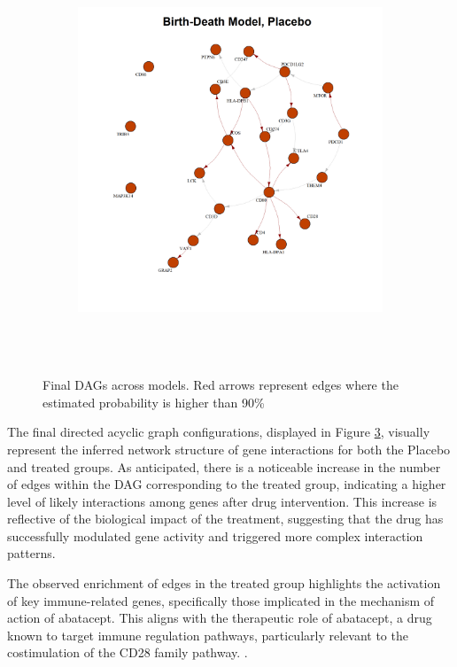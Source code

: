 \documentclass{report}
\begin{document}
\begin{figure}[!ht]
{\begin{minipage}{\textwidth}
\begin{subfigure}[b]{0.45\textwidth}
					\label{fig:net_ad_placebo}
				\end{subfigure}
				\hspace{0.35cm}
				\begin{subfigure}[b]{0.45\textwidth}   
					\centering
					\includegraphics[width=\textwidth, height=12cm]{Figures/Application/analysis/net_BD_placebo.png}
					\label{fig:net_BD_placebo}
				\end{subfigure}
			\end{minipage}
		}
		\caption{Final DAGs across models. Red arrows represent edges where the estimated probability is higher than 90\%}
		\label{fig: final-net}
	\end{figure}

	The final directed acyclic graph configurations, displayed in Figure \ref{fig: final-net}, visually represent the inferred network structure of gene interactions for both the Placebo and treated groups. As anticipated, there is a noticeable increase in the number of edges within the DAG corresponding to the treated group, indicating a higher level of likely interactions among genes after drug intervention. This increase is reflective of the biological impact of the treatment, suggesting that the drug has successfully modulated gene activity and triggered more complex interaction patterns.
	
	The observed enrichment of edges in the treated group highlights the activation of key immune-related genes, specifically those implicated in the mechanism of action of abatacept. This aligns with the therapeutic role of abatacept, a drug known to target immune regulation pathways, particularly relevant to the costimulation of the CD28 family pathway. .
	
\end{document}
